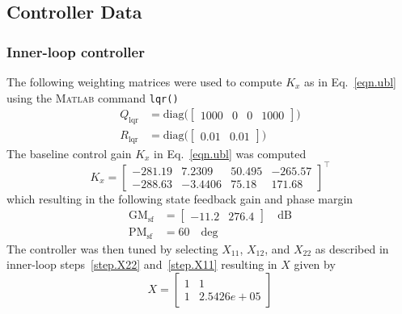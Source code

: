\subsection{Controller Data}

\subsubsection{Inner-loop controller}

The following weighting matrices were used to compute $K_{x}$ as in Eq.\ \eqref{eqn.ubl} using the \textsc{Matlab} command \texttt{lqr()}
\begin{equation*}
  \begin{aligned}
    Q_{\text{lqr}} &=
    \text{diag}\bigr(
    \begin{bmatrix}
      1000 & 0 & 0 & 1000
    \end{bmatrix}
    \bigr) \\
    R_{\text{lqr}}
    &=
    \text{diag}\bigr(
    \begin{bmatrix}
      0.01 & 0.01
    \end{bmatrix}
    \bigr)
  \end{aligned}
\end{equation*}
The baseline control gain $K_{x}$ in Eq.\ \eqref{eqn.ubl} was computed
\begin{equation*}
  K_{x} =
  \begin{bmatrix}
    -281.19 & 7.2309 & 50.495 & -265.57 \\
    -288.63 & -3.4406 & 75.18 & 171.68
  \end{bmatrix}^{\top}
 \end{equation*}
which resulting in the following state feedback gain and phase margin
\begin{align*}
  \text{GM}_{\text{sf}} &=
  \begin{bmatrix}
    -11.2 & 276.4
  \end{bmatrix}
  \quad \text{dB} \\
  \text{PM}_{\text{sf}} &=
  60
  \quad \text{deg}
\end{align*}
The controller was then tuned by selecting $X_{11}$, $X_{12}$, and $X_{22}$ as described in inner-loop steps~\ref{step.X22} and~\ref{step.X11} resulting in $X$ given by
\begin{equation*}
  X=
  \begin{bmatrix}
    1 & 1 \\
    1 & 2.5426e+05
  \end{bmatrix}
\end{equation*}
